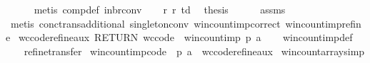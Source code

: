 \begin{isabellebody}
\ \ \ \ \isamarkupfalse%
\ {\isacharparenleft}{\kern0pt}metis\ comp{\isacharunderscore}{\kern0pt}def\ in{\isacharunderscore}{\kern0pt}br{\isacharunderscore}{\kern0pt}conv{\isacharparenright}{\kern0pt}\isanewline
\ \ \isamarkupfalse%
\ r{}\ r{}\ td\ \isamarkupfalse%
\ {\isacharquery}{\kern0pt}thesis\isanewline
\ \ \ \ \isamarkupfalse%
\ assms\isanewline
\ \ \ \ \isamarkupfalse%
\ {\isacharparenleft}{\kern0pt}metis\ conc{\isacharunderscore}{\kern0pt}trans{\isacharunderscore}{\kern0pt}additional{\isacharparenleft}{\kern0pt}{}{\isacharparenright}{\kern0pt}\ singleton{\isacharunderscore}{\kern0pt}conv\ win{\isacharunderscore}{\kern0pt}count{\isacharunderscore}{\kern0pt}imp{\isacharprime}{\kern0pt}{\isacharunderscore}{\kern0pt}correct\ win{\isacharunderscore}{\kern0pt}count{\isacharunderscore}{\kern0pt}imp{}{\isacharunderscore}{\kern0pt}refine{\isacharparenright}{\kern0pt}\isanewline
{}\isamarkupfalse%
%
\endisatagproof
{\isafoldproof}%
%
\isadelimproof
\isanewline
%
\endisadelimproof
\isanewline
{}\isamarkupfalse%
\ wc{\isacharunderscore}{\kern0pt}code{\isacharunderscore}{\kern0pt}refine{\isacharunderscore}{\kern0pt}aux{\isacharcolon}{\kern0pt}\ {\isachardoublequoteopen}RETURN\ {\isacharquery}{\kern0pt}wc{\isacharunderscore}{\kern0pt}code\ {\isasymle}\ win{\isacharunderscore}{\kern0pt}count{\isacharunderscore}{\kern0pt}imp{}\ p\ a{\isachardoublequoteclose}\isanewline
%
\isadelimproof
\ \ %
\endisadelimproof
%
\isatagproof
{}\isamarkupfalse%
\ win{\isacharunderscore}{\kern0pt}count{\isacharunderscore}{\kern0pt}imp{}{\isacharunderscore}{\kern0pt}def\isanewline
\ \ \isamarkupfalse%
\ {\isacharparenleft}{\kern0pt}refine{\isacharunderscore}{\kern0pt}transfer{\isacharparenright}{\kern0pt}%
\endisatagproof
{\isafoldproof}%
%
\isadelimproof
\isanewline
%
\endisadelimproof
\isanewline
{}\isamarkupfalse%
\ win{\isacharunderscore}{\kern0pt}count{\isacharunderscore}{\kern0pt}imp{\isacharunderscore}{\kern0pt}code\ \ p\ a\ \ wc{\isacharunderscore}{\kern0pt}code{\isacharunderscore}{\kern0pt}refine{\isacharunderscore}{\kern0pt}aux\isanewline
\isanewline
{}\isamarkupfalse%
\ win{\isacharunderscore}{\kern0pt}count{\isacharunderscore}{\kern0pt}array{\isacharbrackleft}{\kern0pt}simp{\isacharbrackright}{\kern0pt}{\isacharcolon}{\kern0pt}\isanewline

\end{isabellebody}
